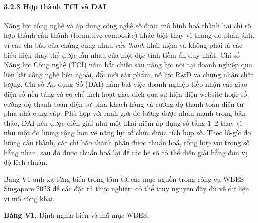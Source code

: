 \documentclass[12pt,a4paper]{article}
\begin{document}
\hypertarget{323-hux1ee3p-thuxe0nh-tci-vuxe0-dai}{%
\paragraph{3.2.3 Hợp thành TCI và
DAI}\label{323-hux1ee3p-thuxe0nh-tci-vuxe0-dai}}

Năng lực công nghệ và áp dụng công nghệ số được mô hình hoá thành hai
chỉ số hợp thành cấu thành (formative composite) khác biệt thay vì thang
đo phản ánh, vì các chỉ báo của chúng cùng nhau \emph{cấu thành} khái
niệm và không phải là các biểu hiện thay thế được lẫn nhau của một đặc
tính tiềm ẩn duy nhất. Chỉ số Năng lực Công nghệ (TCI) nắm bắt chiều sâu
năng lực nội tại doanh nghiệp qua liên kết công nghệ bên ngoài, đổi mới
sản phẩm, nỗ lực R\&D và chứng nhận chất lượng. Chỉ số Áp dụng Số (DAI)
nắm bắt việc doanh nghiệp tiếp nhận các giao diện số nền tảng và cơ chế
kích hoạt giao dịch qua sự hiện diện website hoặc số, cường độ thanh
toán điện tử phía khách hàng và cường độ thanh toán điện tử phía nhà
cung cấp. Phù hợp với ranh giới đo lường được nhấn mạnh trong bản thảo,
DAI nên được diễn giải như một khái niệm áp dụng số tầng 1--2 thay vì
như một đo lường rộng hơn về năng lực tổ chức được tích hợp số. Theo
lô-gíc đo lường cấu thành, các chỉ báo thành phần được chuẩn hoá, tổng
hợp với trọng số bằng nhau, sau đó được chuẩn hoá lại để các hệ số có
thể diễn giải bằng đơn vị độ lệch chuẩn.

Bảng V1 ánh xạ từng biến trọng tâm tới các mục nguồn trong công cụ WBES
Singapore 2023 để các đặc tả thực nghiệm có thể truy nguyên đầy đủ về dữ
liệu vi mô công khai.

\textbf{Bảng V1.} Định nghĩa biến và mã mục WBES.
\end{document}
